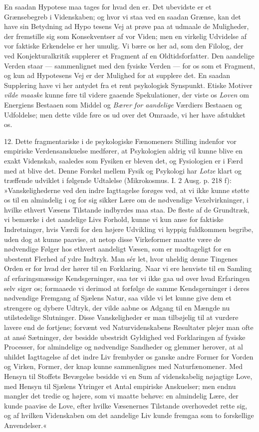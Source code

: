 \documentclass[12pt,a4paper,openany]{book}
\newcommand{\opage}[1]{\marginnote{\footnotesize\textit{[#1]}}}
\begin{document}
En saadan Hypotese maa tages for hvad den er. Det ubevidste er et
Grænsebegreb i Videnskaben; og hvor vi staa ved en saadan Grænse, kan
det have sin Betydning ad Hypo%
\opage{100}tesens Vej at prøve paa at udmaale de Muligheder, der
fremstille sig som Konsekventser af vor Viden; men en virkelig Udvidelse
af vor faktiske Erkendelse er her umulig. Vi bære os her ad, som den
Filolog, der ved Konjekturalkritik supplerer et Fragment af en
Oldtidsforfatter. Den aandelige Verden staar --- sammenlignet med den
fysiske Verden --- for os som et Fragment, og kun ad Hypotesens Vej er
der Mulighed for at supplere det. En saadan Supplering have vi her
antydet fra et rent psykologisk Synspunkt. Etiske Motiver \emph{vilde
maaske} kunne føre til videre gaaende Spekulationer, der viste os
\emph{Loven} om Energiens Bestaaen som Middel og \emph{Bærer for
aandelige} Værdiers Bestaaen og Udfoldelse; men dette vilde føre os ud
over det Omraade, vi her have afstukket os.

12. Dette fragmentariske i de psykologiske Fænomeners Stilling indenfor
vor empiriske Verdensanskuelse medfører, at Psykologien aldrig vil kunne
blive en exakt Videnskab, saaledes som Fysiken er bleven det, og
Fysiologien er i Færd med at blive det. Denne Forskel mellem Fysik og
Psykologi har \emph{Lotze} klart og træffende udviklet i følgende
Udtalelse (Mikrokosmus. I. 2 Ausg. p. 218 f): »Vanskelighederne ved den
indre Iagttagelse forøges ved, at vi ikke kunne støtte os til en
almindelig i og for sig sikker Lære om de nødvendige Vexelvirkninger, i
hvilke ethvert Væsens Tilstande indbyrdes maa staa. De fleste af de
Grundtræk, vi bemærke i det aandelige Livs Forhold, kunne vi kun anse
for faktiske Indretninger, hvis Værdi for den højere Udvikling vi hyppig
fuldkommen begribe, uden dog at kunne paavise, at netop disse
Virkeformer maatte være de nødvendige Følger hos ethvert aandeligt
Væsen, som er modtageligt for en ubestemt Flerhed af ydre Indtryk. Man
sér let, hvor uheldig denne Tingenes Orden er for hvad der hører til en
Forklaring. Naar vi ere henviste til en Samling af erfaringsmæssige
Kendsgerninger, saa tør vi ikke gaa ud over hvad Erfaringen selv siger
os; formaaede vi derimod at forfølge de samme Kendsgerninger i deres
nødvendige Fremgang af Sjælens Natur, saa vilde vi let kunne give dem et
strengere og dybere Udtryk, der vilde aabne os Adgang til en Mængde nu
utilstedelige Slutninger. Disse Vanskeligheder er man tilbøjelig til at
vurdere lavere end de fortjene; forvænt ved Naturvidenskabens Resultater
\opage{101}plejer man ofte at ansé Sætninger, der besidde ubestridt
Gyldighed ved Forklaringen af fysiske Processer, for almindelige og
nødvendige Sandheder og glemmer herover, at al uhildet Iagttagelse af
det indre Liv frembyder os ganske andre Former for Vorden og Virken,
Former, der knap kunne sammenlignes med Naturfænomener. Med Hensyn til
Stoffets Bevægelse besidde vi en Sum af videnskabelig nøjagtige Love,
med Hensyn til Sjælens Ytringer et Antal empiriske Anskuelser; men endnu
mangler det tredie og højere, som vi maatte behøve: en almindelig Lære,
der kunde paavise de Love, efter hvilke Væsenernes Tilstande overhovedet
rette sig, og af hvilken Videnskaben om det aandelige Liv kunde fremgaa
som to forskellige Anvendelser.«
\end{document}
